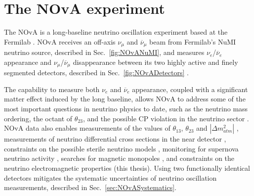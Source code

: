 \chapter{The NOvA experiment}\label{sec:NOvA}


The \gls{NOvA} \cite{NOvAWebsite} is a long-baseline neutrino oscillation experiment based at the \gls{Fermilab}
\cite{FNALWebsite}. \gls{NOvA} receives an off-axis $\nu_\mu$ and $\overline{\nu}_\mu$ beam from \gls{Fermilab}'s \gls{NuMI} neutrino source, described in Sec.~\ref{fig:NOvANuMI}, and measures $\nu_e$/$\overline{\nu}_e$ appearance and $\nu_\mu$/$\overline{\nu}_\mu$ disappearance between its two highly active and finely segmented detectors, described in Sec.~\ref{fig:NOvADetectors} \cite{PhysicsOfNOvA.pdf}. 

The capability to measure both $\nu_e$ and $\overline{\nu}_e$ appearance, coupled with a significant matter effect induced by the long baseline, allows \gls{NOvA} to address some of the most important questions in neutrino physics to date, such as the neutrino mass ordering, the octant of $\theta_{23}$, and the possible \gls{CP} violation in the neutrino sector \cite{PhysicsOfNOvA.pdf,NOvAStatusAndOutlook.pdf,FirstNOvAResult.pdf,2019NOvAFHCRHCResults.pdf,NOvAResults2021.pdf}. \gls{NOvA} data also enables measurements of the values of $\theta_{13}$, $\theta_{23}$ and $\left|\Delta m^2_{atm}\right|$ \cite{PhysicsOfNOvA.pdf}, measurements of neutrino differential cross sections in the near detector \cite{NOvANCPi0XSecMeasurement2019.pdf, NOvANumuCCXSexMeasurement2023.pdf, NOvANueCCXSecMeasurement2023.pdf, NOvANuMuCCPi0XSecMeasurement2023.pdf}, constraints on the possible sterile neutrino models \cite{NOvASterilesFHCResults2017.pdf, NOvASterilesFHCRHCResults2021.pdf}, monitoring for supernova neutrino activity \cite{NOvASupernovaMeasurements2020.pdf, NOvASupernovaCoincidenceMeasurements2021.pdf}, searches for magnetic monopoles \cite{NOvASlowMagMonopoles2021.pdf}, and constraints on the neutrino electromagnetic properties (this thesis). Using two functionally identical detectors mitigates the systematic uncertainties of neutrino oscillation measurements, described in Sec.~\ref{sec:NOvASystematics}.



